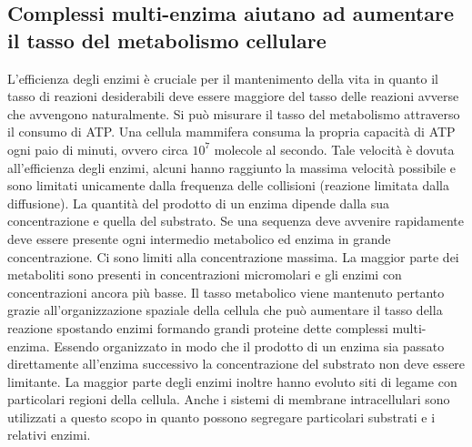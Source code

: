 \subsection{Complessi multi-enzima aiutano ad aumentare il tasso del metabolismo cellulare}
L'efficienza degli enzimi \`e cruciale per il mantenimento della vita in quanto il tasso di reazioni desiderabili deve essere maggiore del tasso delle reazioni avverse che avvengono 
naturalmente. Si pu\`o misurare il tasso del metabolismo attraverso il consumo di ATP. Una cellula mammifera consuma la propria capacit\`a di ATP ogni paio di minuti, ovvero circa 
$10^7$ molecole al secondo. Tale velocit\`a \`e dovuta all'efficienza degli enzimi, alcuni hanno raggiunto la massima velocit\`a possibile e sono limitati unicamente dalla frequenza
delle collisioni (reazione limitata dalla diffusione). La quantit\`a del prodotto di un enzima dipende dalla sua concentrazione e quella del substrato. Se una sequenza deve avvenire 
rapidamente deve essere presente ogni intermedio metabolico ed enzima in grande concentrazione. Ci sono limiti alla concentrazione massima. La maggior parte dei metaboliti sono presenti
in concentrazioni micromolari e gli enzimi con concentrazioni ancora pi\`u basse. Il tasso metabolico viene mantenuto pertanto grazie all'organizzazione spaziale della cellula che
pu\`o aumentare il tasso della reazione spostando enzimi formando grandi proteine dette complessi multi-enzima. Essendo organizzato in modo che il prodotto di un enzima sia passato 
direttamente all'enzima successivo la concentrazione del substrato non deve essere limitante. La maggior parte degli enzimi inoltre hanno evoluto siti di legame con particolari regioni
della cellula. Anche i sistemi di membrane intracellulari sono utilizzati a questo scopo in quanto possono segregare particolari substrati e i relativi enzimi. 
